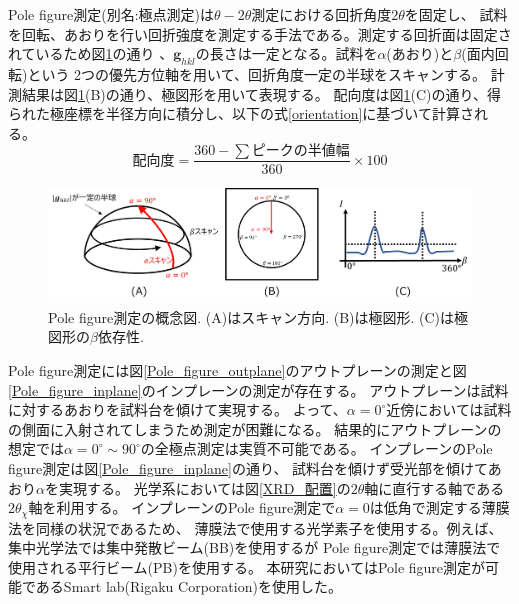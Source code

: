 \documentclass[dvipdfmx,12pt,a4paper]{jreport}
\begin{document}
			Pole figure測定(別名:極点測定)は$\theta-2\theta$測定における回折角度$2\theta$を固定し、
			試料を回転、あおりを行い回折強度を測定する手法である。測定する回折面は固定されているため図\ref{極点の測定方法}の通り
			、$\bm{g}_{hkl}$の長さは一定となる。試料を$\alpha$(あおり)と$\beta$(面内回転)という
			2つの優先方位軸を用いて、回折角度一定の半球をスキャンする。
			計測結果は図\ref{極点の測定方法}(B)の通り、極図形を用いて表現する。
			配向度は図\ref{極点の測定方法}(C)の通り、得られた極座標を半径方向に積分し、以下の式\ref{orientation}に基づいて計算される。
			\begin{equation}
				配向度 = \frac{360 - \sum ピークの半値幅 }{360}\times 100
				\label{orientation}
			\end{equation}
			\begin{figure}[h]
				\centering
				\includegraphics[width=\linewidth]{極点の測定方法.jpg}
				\caption{Pole figure測定の概念図. (A)はスキャン方向. (B)は極図形. (C)は極図形の$\beta$依存性.}
				\label{極点の測定方法}
			\end{figure}
			\newpage
			Pole figure測定には図\ref{Pole_figure_outplane}のアウトプレーンの測定と図\ref{Pole_figure_inplane}のインプレーンの測定が存在する。
			アウトプレーンは試料に対するあおりを試料台を傾けて実現する。
			よって、$\alpha=0^{\circ}$近傍においては試料の側面に入射されてしまうため測定が困難になる。
			結果的にアウトプレーンの想定では$\alpha=0^{\circ}\sim90^{\circ}$の全極点測定は実質不可能である。
			インプレーンのPole figure測定は図\ref{Pole_figure_inplane}の通り、
			試料台を傾けず受光部を傾けてあおり$\alpha$を実現する。
			光学系においては図\ref{XRD_配置}の$2\theta$軸に直行する軸である$2\theta_\chi$軸を利用する。
			インプレーンのPole figure測定で$\alpha=0$は低角で測定する薄膜法を同様の状況であるため、
			薄膜法で使用する光学素子を使用する。例えば、集中光学法では集中発散ビーム(BB)を使用するが
			Pole figure測定では薄膜法で使用される平行ビーム(PB)を使用する。
			本研究においてはPole figure測定が可能であるSmart lab(Rigaku Corporation)を使用した。
			
\end{document}
